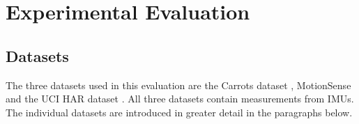 \documentclass[11pt,titlepage,oneside,openany]{book}
\renewcommand{\algorithmiccomment}[1]{\ensuremath{\rhd} \textit{#1}}
\def\MYCALL#1#2{{\small\textsc{#1}}(\textup{#2})}
\def\MYNOT{\textbf{ not }}
\def\MYBREAK{\textbf{break }}
\def\MYNIL{\textsc{Nil}}
\def\ONT{{\mathcal O}} %
\def\ALI{{\mathcal A}} %
\begin{document}

\chapter{Experimental Evaluation}
\label{cha:exp}

\section{Datasets}
\label{sec:data}
The three datasets used in this evaluation are the Carrots dataset \cite{kruger_recognising_2011}, MotionSense \cite{malekzadeh_mobile_2019} and the UCI HAR dataset  \cite{anguita_public_2013}. All three datasets contain measurements from IMUs. The individual datasets are introduced in greater detail in the paragraphs below.
\end{document}
